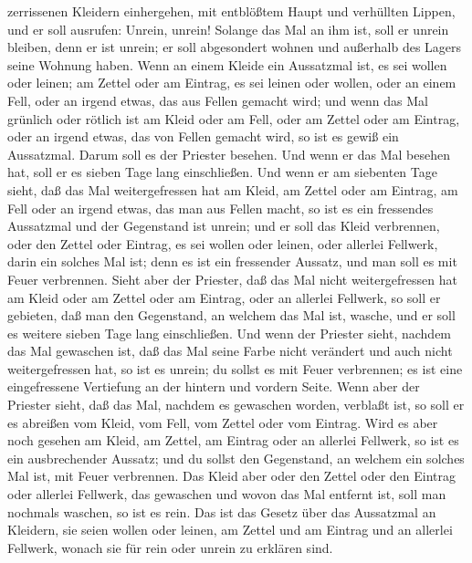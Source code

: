 zerrissenen Kleidern einhergehen, mit entblößtem Haupt und verhüllten
Lippen, und er soll ausrufen: Unrein, unrein!  Solange
das Mal an ihm ist, soll er unrein bleiben, denn er ist unrein; er soll
abgesondert wohnen und außerhalb des Lagers seine Wohnung haben.
 Wenn an einem Kleide ein Aussatzmal ist, es sei wollen
oder leinen;  am Zettel oder am Eintrag, es sei leinen
oder wollen, oder an einem Fell, oder an irgend etwas, das aus Fellen
gemacht wird;  und wenn das Mal grünlich oder rötlich ist
am Kleid oder am Fell, oder am Zettel oder am Eintrag, oder an irgend
etwas, das von Fellen gemacht wird, so ist es gewiß ein Aussatzmal.
Darum soll es der Priester besehen.  Und wenn er das Mal
besehen hat, soll er es sieben Tage lang einschließen. 
Und wenn er am siebenten Tage sieht, daß das Mal weitergefressen hat am
Kleid, am Zettel oder am Eintrag, am Fell oder an irgend etwas, das man
aus Fellen macht, so ist es ein fressendes Aussatzmal und der Gegenstand
ist unrein;  und er soll das Kleid verbrennen, oder den
Zettel oder Eintrag, es sei wollen oder leinen, oder allerlei Fellwerk,
darin ein solches Mal ist; denn es ist ein fressender Aussatz, und man
soll es mit Feuer verbrennen.  Sieht aber der Priester,
daß das Mal nicht weitergefressen hat am Kleid oder am Zettel oder am
Eintrag, oder an allerlei Fellwerk,  so soll er gebieten,
daß man den Gegenstand, an welchem das Mal ist, wasche, und er soll es
weitere sieben Tage lang einschließen.  Und wenn der
Priester sieht, nachdem das Mal gewaschen ist, daß das Mal seine Farbe
nicht verändert und auch nicht weitergefressen hat, so ist es unrein; du
sollst es mit Feuer verbrennen; es ist eine eingefressene Vertiefung an
der hintern und vordern Seite.  Wenn aber der Priester
sieht, daß das Mal, nachdem es gewaschen worden, verblaßt ist, so soll
er es abreißen vom Kleid, vom Fell, vom Zettel oder vom Eintrag.
 Wird es aber noch gesehen am Kleid, am Zettel, am
Eintrag oder an allerlei Fellwerk, so ist es ein ausbrechender Aussatz;
und du sollst den Gegenstand, an welchem ein solches Mal ist, mit Feuer
verbrennen.  Das Kleid aber oder den Zettel oder den
Eintrag oder allerlei Fellwerk, das gewaschen und wovon das Mal entfernt
ist, soll man nochmals waschen, so ist es rein.  Das ist
das Gesetz über das Aussatzmal an Kleidern, sie seien wollen oder
leinen, am Zettel und am Eintrag und an allerlei Fellwerk, wonach sie
für rein oder unrein zu erklären sind.

